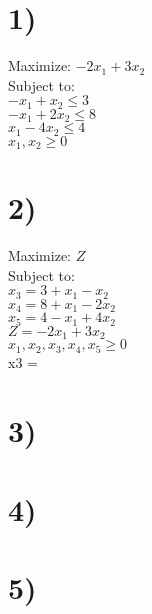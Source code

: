 \section*{1)}
Maximize: $-2x_1+3x_2$ \\
Subject to:\\
$-x_1+x_2 \leq 3$ \\
$-x_1+2x_2 \leq 8$ \\
$x_1-4x_2 \leq 4$ \\
$x_1, x_2 \geq 0$ \\

\section*{2)}
Maximize: $Z$ \\
Subject to:\\
$x_3 = 3+x_1-x_2$ \\
$x_4 = 8+x_1-2x_2$ \\
$x_5 = 4-x_1+4x_2$ \\
$Z = -2x_1+3x_2$ \\
$x_1, x_2, x_3, x_4, x_5 \geq 0$ \\

x3 = 

\section*{3)}

\section*{4)}

\section*{5)}